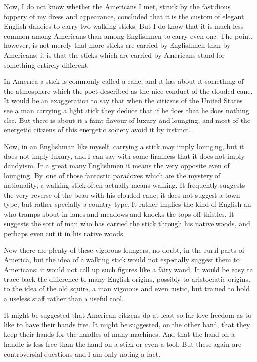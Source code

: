 \documentclass{book}
\begin{document}
Now, I do not know whether the Americans I met, struck by the fastidious foppery of my dress and appearance, concluded that it is the custom of elegant English dandies to carry two walking sticks. But I do know that it is much less common among Americans than among Englishmen to carry even one. The point, however, is not merely that more sticks are carried by Englishmen than by Americans; it is that the sticks which are carried by Americans stand for something entirely different.

In America a stick is commonly called a cane, and it has about it something of the atmosphere which the poet described as the nice conduct of the clouded cane. It would be an exaggeration to say that when the citizens of the United States see a man carrying a light stick they deduce that if he does that he does nothing else. But there is about it a faint flavour of luxury and lounging, and most of the energetic citizens of this energetic society avoid it by instinct.

Now, in an Englishman like myself, carrying a stick may imply lounging, but it does not imply luxury, and I can say with some firmness that it does not imply dandyism. In a great many Englishmen it means the very opposite even of lounging. By. one of those fantastic paradoxes which are the mystery of nationality, a walking stick often actually means walking. It frequently suggests the very reverse of the beau with his clouded cane; it does not suggest a town type, but rather specially a country type. It rather implies the kind of English an who tramps about in lanes and meadows and knocks the tops off thistles. It suggests the sort of man who has carried the stick through his native woods, and perhaps even cut it in his native woods.

Now there are plenty of these vigorous loungers, no doubt, in the rural parts of America, but the idea of a walking stick would not especially suggest them to Americans; it would not call up such figures like a fairy wand. It would be easy ta trace back the difference to many English origins, possibly to aristocratic origins, to the idea of the old squire, a man vigorous and even rustic, but trained to hold a useless staff rather than a useful tool.

It might be suggested that American citizens do at least so far love freedom as to like to have their hands free. It might be suggested, on the other hand, that they keep their hands for the handles of many machines. And that the hand on a handle is less free than the hand on a stick or even a tool. But these again are controversial questions and I am only noting a fact.
\end{document}

